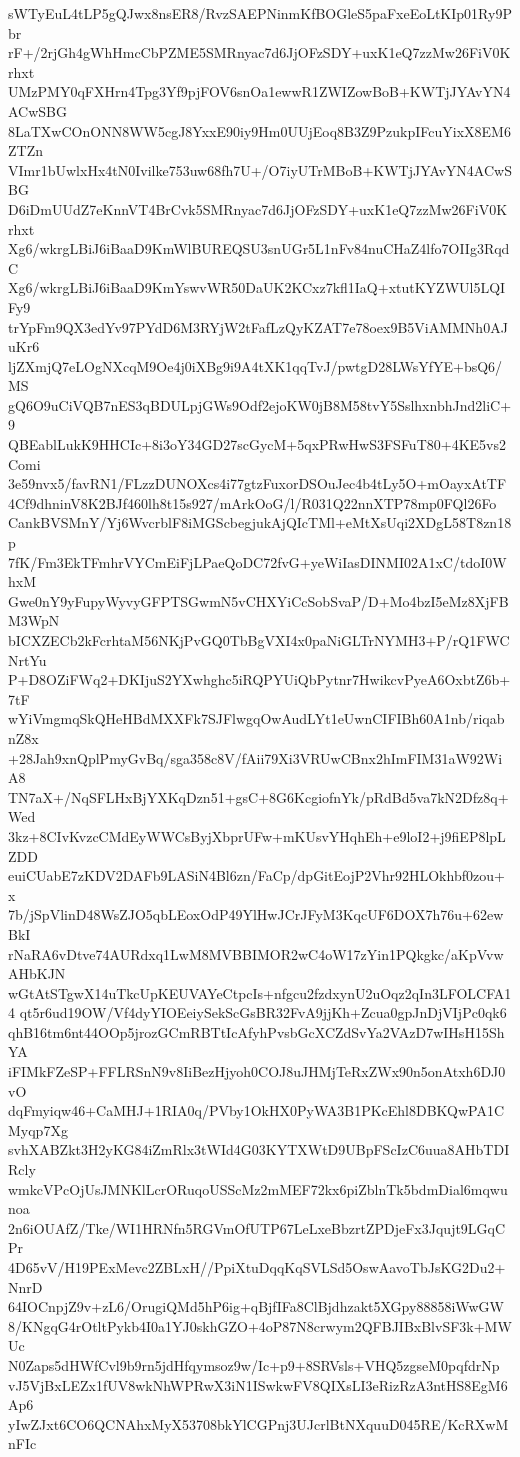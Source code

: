 sWTyEuL4tLP5gQJwx8nsER8/RvzSAEPNinmKfBOGleS5paFxeEoLtKIp01Ry9Pbr
rF+/2rjGh4gWhHmcCbPZME5SMRnyac7d6JjOFzSDY+uxK1eQ7zzMw26FiV0Krhxt
UMzPMY0qFXHrn4Tpg3Yf9pjFOV6snOa1ewwR1ZWIZowBoB+KWTjJYAvYN4ACwSBG
8LaTXwCOnONN8WW5cgJ8YxxE90iy9Hm0UUjEoq8B3Z9PzukpIFcuYixX8EM6ZTZn
VImr1bUwlxHx4tN0Ivilke753uw68fh7U+/O7iyUTrMBoB+KWTjJYAvYN4ACwSBG
D6iDmUUdZ7eKnnVT4BrCvk5SMRnyac7d6JjOFzSDY+uxK1eQ7zzMw26FiV0Krhxt
Xg6/wkrgLBiJ6iBaaD9KmWlBUREQSU3snUGr5L1nFv84nuCHaZ4lfo7OIIg3RqdC
Xg6/wkrgLBiJ6iBaaD9KmYswvWR50DaUK2KCxz7kfl1IaQ+xtutKYZWUl5LQIFy9
trYpFm9QX3edYv97PYdD6M3RYjW2tFafLzQyKZAT7e78oex9B5ViAMMNh0AJuKr6
ljZXmjQ7eLOgNXcqM9Oe4j0iXBg9i9A4tXK1qqTvJ/pwtgD28LWsYfYE+bsQ6/MS
gQ6O9uCiVQB7nES3qBDULpjGWs9Odf2ejoKW0jB8M58tvY5SslhxnbhJnd2liC+9
QBEablLukK9HHCIc+8i3oY34GD27scGycM+5qxPRwHwS3FSFuT80+4KE5vs2Comi
3e59nvx5/favRN1/FLzzDUNOXcs4i77gtzFuxorDSOuJec4b4tLy5O+mOayxAtTF
4Cf9dhninV8K2BJf460lh8t15s927/mArkOoG/l/R031Q22nnXTP78mp0FQl26Fo
CankBVSMnY/Yj6WvcrblF8iMGScbegjukAjQIcTMl+eMtXsUqi2XDgL58T8zn18p
7fK/Fm3EkTFmhrVYCmEiFjLPaeQoDC72fvG+yeWiIasDINMI02A1xC/tdoI0WhxM
Gwe0nY9yFupyWyvyGFPTSGwmN5vCHXYiCcSobSvaP/D+Mo4bzI5eMz8XjFBM3WpN
bICXZECb2kFcrhtaM56NKjPvGQ0TbBgVXI4x0paNiGLTrNYMH3+P/rQ1FWCNrtYu
P+D8OZiFWq2+DKIjuS2YXwhghc5iRQPYUiQbPytnr7HwikcvPyeA6OxbtZ6b+7tF
wYiVmgmqSkQHeHBdMXXFk7SJFlwgqOwAudLYt1eUwnCIFIBh60A1nb/riqabnZ8x
+28Jah9xnQplPmyGvBq/sga358c8V/fAii79Xi3VRUwCBnx2hImFIM31aW92WiA8
TN7aX+/NqSFLHxBjYXKqDzn51+gsC+8G6KcgiofnYk/pRdBd5va7kN2Dfz8q+Wed
3kz+8CIvKvzcCMdEyWWCsByjXbprUFw+mKUsvYHqhEh+e9loI2+j9fiEP8lpLZDD
euiCUabE7zKDV2DAFb9LASiN4Bl6zn/FaCp/dpGitEojP2Vhr92HLOkhbf0zou+x
7b/jSpVlinD48WsZJO5qbLEoxOdP49YlHwJCrJFyM3KqcUF6DOX7h76u+62ewBkI
rNaRA6vDtve74AURdxq1LwM8MVBBIMOR2wC4oW17zYin1PQkgkc/aKpVvwAHbKJN
wGtAtSTgwX14uTkcUpKEUVAYeCtpcIs+nfgcu2fzdxynU2uOqz2qIn3LFOLCFA14
qt5r6ud19OW/Vf4dyYIOEeiySekScGsBR32FvA9jjKh+Zcua0gpJnDjVIjPc0qk6
qhB16tm6nt44OOp5jrozGCmRBTtIcAfyhPvsbGcXCZdSvYa2VAzD7wIHsH15ShYA
iFIMkFZeSP+FFLRSnN9v8IiBezHjyoh0COJ8uJHMjTeRxZWx90n5onAtxh6DJ0vO
dqFmyiqw46+CaMHJ+1RIA0q/PVby1OkHX0PyWA3B1PKcEhl8DBKQwPA1CMyqp7Xg
svhXABZkt3H2yKG84iZmRlx3tWId4G03KYTXWtD9UBpFScIzC6uua8AHbTDIRcly
wmkcVPcOjUsJMNKlLcrORuqoUSScMz2mMEF72kx6piZblnTk5bdmDial6mqwunoa
2n6iOUAfZ/Tke/WI1HRNfn5RGVmOfUTP67LeLxeBbzrtZPDjeFx3Jqujt9LGqCPr
4D65vV/H19PExMevc2ZBLxH//PpiXtuDqqKqSVLSd5OswAavoTbJsKG2Du2+NnrD
64IOCnpjZ9v+zL6/OrugiQMd5hP6ig+qBjfIFa8ClBjdhzakt5XGpy88858iWwGW
8/KNgqG4rOtltPykb4I0a1YJ0skhGZO+4oP87N8crwym2QFBJIBxBlvSF3k+MWUc
N0Zaps5dHWfCvl9b9rn5jdHfqymsoz9w/Ic+p9+8SRVsls+VHQ5zgseM0pqfdrNp
vJ5VjBxLEZx1fUV8wkNhWPRwX3iN1ISwkwFV8QIXsLI3eRizRzA3ntHS8EgM6Ap6
yIwZJxt6CO6QCNAhxMyX53708bkYlCGPnj3UJcrlBtNXquuD045RE/KcRXwMnFIc
